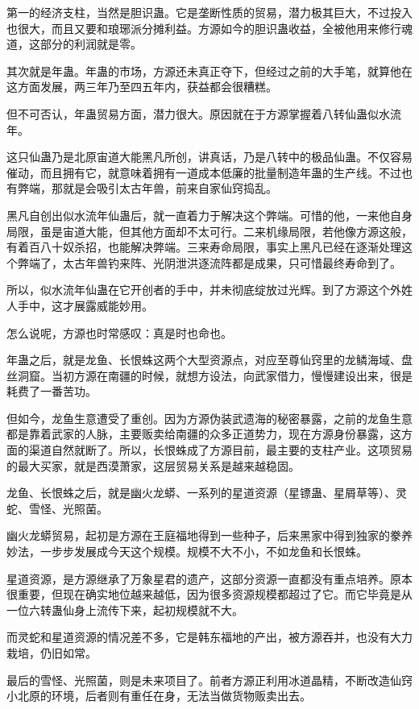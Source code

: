 \begin{this_body}
第一的经济支柱，当然是胆识蛊。它是垄断性质的贸易，潜力极其巨大，不过投入也很大，而且又要和琅琊派分摊利益。方源如今的胆识蛊收益，全被他用来修行魂道，这部分的利润就是零。

其次就是年蛊。年蛊的市场，方源还未真正夺下，但经过之前的大手笔，就算他在这方面发展，两三年乃至四五年内，获益都会很糟糕。

但不可否认，年蛊贸易方面，潜力很大。原因就在于方源掌握着八转仙蛊似水流年。

这只仙蛊乃是北原宙道大能黑凡所创，讲真话，乃是八转中的极品仙蛊。不仅容易催动，而且拥有它，就意味着拥有一道成本低廉的批量制造年蛊的生产线。不过也有弊端，那就是会吸引太古年兽，前来自家仙窍捣乱。

黑凡自创出似水流年仙蛊后，就一直着力于解决这个弊端。可惜的他，一来他自身局限，虽是宙道大能，但其他方面却不太可行。二来机缘局限，若他像方源这般，有着百八十奴杀招，也能解决弊端。三来寿命局限，事实上黑凡已经在逐渐处理这个弊端了，太古年兽钓来阵、光阴泄洪逐流阵都是成果，只可惜最终寿命到了。

所以，似水流年仙蛊在它开创者的手中，并未彻底绽放过光辉。到了方源这个外姓人手中，这才展露威能妙用。

怎么说呢，方源也时常感叹：真是时也命也。

年蛊之后，就是龙鱼、长恨蛛这两个大型资源点，对应至尊仙窍里的龙鳞海域、盘丝洞窟。当初方源在南疆的时候，就想方设法，向武家借力，慢慢建设出来，很是耗费了一番苦功。

但如今，龙鱼生意遭受了重创。因为方源伪装武遗海的秘密暴露，之前的龙鱼生意都是靠着武家的人脉，主要贩卖给南疆的众多正道势力，现在方源身份暴露，这方面的渠道自然就断了。所以，长恨蛛成了方源目前，最主要的支柱产业。这项贸易的最大买家，就是西漠萧家，这层贸易关系是越来越稳固。

龙鱼、长恨蛛之后，就是幽火龙蟒、一系列的星道资源（星镖蛊、星屑草等）、灵蛇、雪怪、光照菌。

幽火龙蟒贸易，起初是方源在王庭福地得到一些种子，后来黑家中得到独家的豢养妙法，一步步发展成今天这个规模。规模不大不小，不如龙鱼和长恨蛛。

星道资源，是方源继承了万象星君的遗产，这部分资源一直都没有重点培养。原本很重要，但现在确实地位越来越低，因为很多资源规模都超过了它。而它毕竟是从一位六转蛊仙身上流传下来，起初规模就不大。

而灵蛇和星道资源的情况差不多，它是韩东福地的产出，被方源吞并，也没有大力栽培，仍旧如常。

最后的雪怪、光照菌，则是未来项目了。前者方源正利用冰道晶精，不断改造仙窍小北原的环境，后者则有重任在身，无法当做货物贩卖出去。


\end{this_body}
